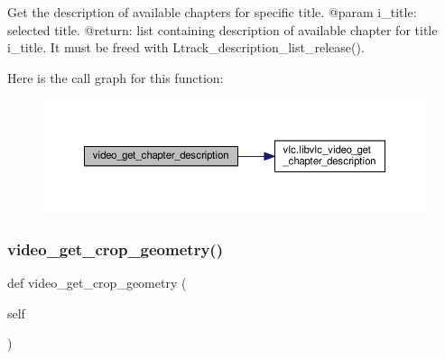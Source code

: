 \begin{DoxyVerb}Get the description of available chapters for specific title.
@param i_title: selected title.
@return: list containing description of available chapter for title i_title. It must be freed with L{track_description_list_release}().
\end{DoxyVerb}
 Here is the call graph for this function\+:
\nopagebreak
\begin{figure}[H]
\begin{center}
\leavevmode
\includegraphics[width=350pt]{classvlc_1_1_media_player_aa0d4ef63e93059de3f836a54dc2fda67_cgraph}
\end{center}
\end{figure}
\mbox{\label{classvlc_1_1_media_player_ab120cd3adba77eb2cbaa9e65eb279ae8}} 
\subsubsection{\texorpdfstring{video\+\_\+get\+\_\+crop\+\_\+geometry()}{video\_get\_crop\_geometry()}}
{\footnotesize\ttfamily def video\+\_\+get\+\_\+crop\+\_\+geometry (\begin{DoxyParamCaption}\item[{}]{self }\end{DoxyParamCaption})}

